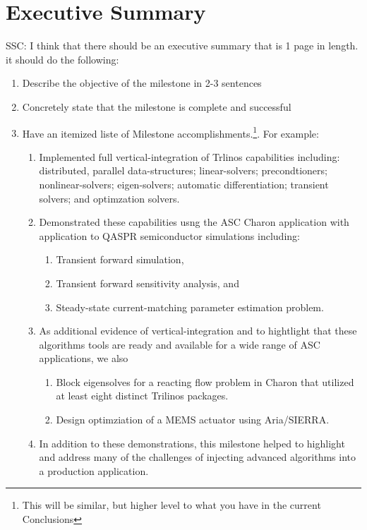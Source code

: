 \documentclass[pdf,ps2pdf,11pt]{SANDreport}
\begin{document}
\section{Executive Summary}
%
%
SSC: I think that there should be an executive summary that is 1 page in
length.  it should do the following:
\vspace{-2ex} %
\begin{enumerate}
\setlength{\itemsep}{-0.4ex}
\item Describe the objective of the milestone in 2-3 sentences
\item Concretely state that the milestone is complete and successful
\item Have an itemized liste of Milestone accomplishments.\footnote{This will
be similar, but higher level to what you have in the current Conclusions}.
For example:
\begin{enumerate}
\setlength{\itemsep}{-0.1ex}
\item Implemented full vertical-integration of Trlinos capabilities including:
distributed, parallel data-structures; linear-solvers; precondtioners;
nonlinear-solvers; eigen-solvers; automatic differentiation; transient
solvers; and optimzation solvers.
\item Demonstrated these capabilities usng the ASC Charon application with
application to QASPR semiconductor simulations including:
\begin{enumerate}
\item Transient forward simulation,
\item Transient forward sensitivity analysis, and
\item Steady-state current-matching parameter estimation problem.
\end{enumerate}
\item As additional evidence of vertical-integration and to hightlight that
these algorithms tools are ready and available for a wide range of ASC
applications, we also
\begin{enumerate}
\item Block eigensolves for a reacting flow problem in Charon that utilized at
least eight distinct Trilinos packages.%
\item Design optimziation of a MEMS actuator using Aria/SIERRA.
\end{enumerate}
\item In addition to these demonstrations, this milestone helped to highlight
and address many of the challenges of injecting advanced algorithms into a
production application.
\end{enumerate}
\end{enumerate}
%
\end{document}
